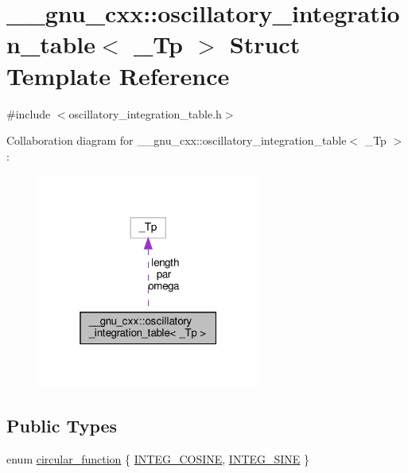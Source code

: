 \hypertarget{struct____gnu__cxx_1_1oscillatory__integration__table}{}\section{\+\_\+\+\_\+gnu\+\_\+cxx\+:\+:oscillatory\+\_\+integration\+\_\+table$<$ \+\_\+\+Tp $>$ Struct Template Reference}
\label{struct____gnu__cxx_1_1oscillatory__integration__table}


{\ttfamily \#include $<$oscillatory\+\_\+integration\+\_\+table.\+h$>$}



Collaboration diagram for \+\_\+\+\_\+gnu\+\_\+cxx\+:\+:oscillatory\+\_\+integration\+\_\+table$<$ \+\_\+\+Tp $>$\+:
\nopagebreak
\begin{figure}[H]
\begin{center}
\leavevmode
\includegraphics[width=208pt]{struct____gnu__cxx_1_1oscillatory__integration__table__coll__graph}
\end{center}
\end{figure}
\subsection*{Public Types}
\begin{DoxyCompactItemize}
\item 
enum \hyperlink{struct____gnu__cxx_1_1oscillatory__integration__table_aea06e472bb9ff6c535cfdc6a84b14e96}{circular\+\_\+function} \{ \hyperlink{struct____gnu__cxx_1_1oscillatory__integration__table_aea06e472bb9ff6c535cfdc6a84b14e96a4dc67b0a19d36f10e54840cb0cf397ef}{I\+N\+T\+E\+G\+\_\+\+C\+O\+S\+I\+NE}, 
\hyperlink{struct____gnu__cxx_1_1oscillatory__integration__table_aea06e472bb9ff6c535cfdc6a84b14e96a1714dec4721f5e596142c8a09f83a743}{I\+N\+T\+E\+G\+\_\+\+S\+I\+NE}
 \}
\end{DoxyCompactItemize}
